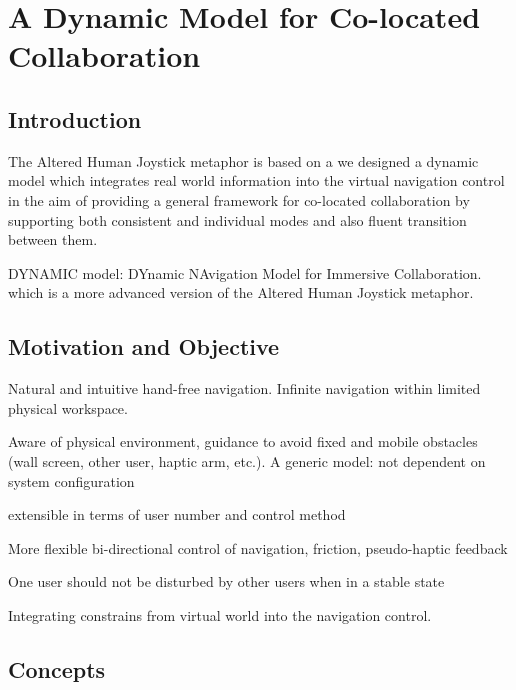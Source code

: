 \chapter{A Dynamic Model for Co-located Collaboration}
\label{chapter:dynamic_model}
\pagebreak

\minitoc

\newpage
\section{Introduction}
The Altered Human Joystick metaphor is based on a 
we designed a dynamic model which integrates real world information into the virtual navigation control in the aim of providing a general framework for co-located collaboration by supporting both consistent and individual modes and also fluent transition between them.

DYNAMIC model: DYnamic NAvigation Model for Immersive Collaboration.  which is a more advanced version of the Altered Human Joystick metaphor.



\section{Motivation and Objective}

Natural and intuitive hand-free navigation. Infinite navigation within limited physical workspace.

Aware of physical environment, guidance to avoid fixed and mobile obstacles (wall screen, other user, haptic arm, etc.). A generic model: not dependent on system configuration
 
extensible in terms of user number and control method

More flexible bi-directional control of navigation, friction, pseudo-haptic feedback

One user should not be disturbed by other users when in a stable state

Integrating constrains from virtual world into the navigation control.



\section{Concepts}

